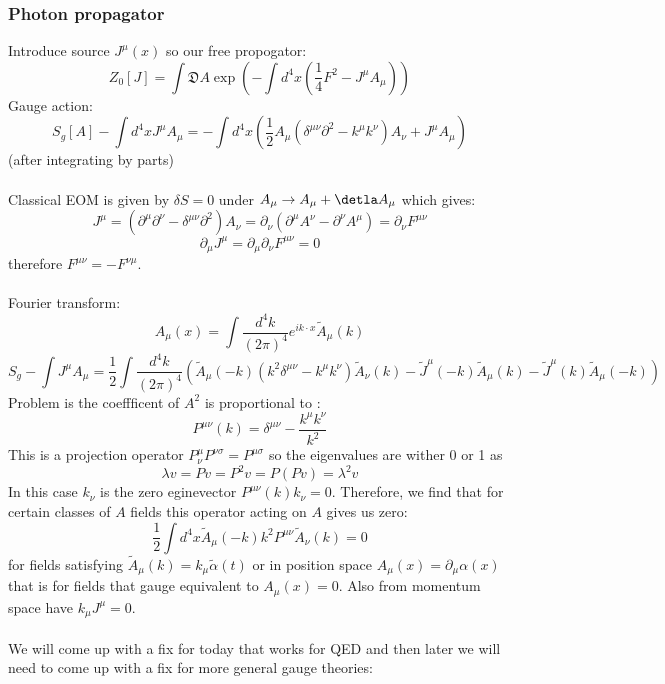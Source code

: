 \documentclass{article}
\begin{document}
      \subsubsection{Photon propagator}
      Introduce source $J^{\mu}(x)$ so our free propogator:
      $$
       Z_0[J] = \int \mathfrak{D} A \exp ( - \int d^4 x ( \frac{1}{4} F^2 - J^{\mu} A_{\mu}))
      $$
      Gauge action:
      $$
       S_g[A] - \int d^4 x J^{\mu} A_{\mu} = - \int d^4 x ( \frac{1}{2} A_{\mu} ( \delta^{\mu \nu} \partial^2 - k^{\mu} k^{\nu}) A_{\nu} + J^{\mu} A_{\mu})
      $$
      (after integrating by parts)\\\\
      Classical EOM is given by $\delta S = 0$ under $A_{\mu} \rightarrow A_{\mu} + \detla A_{\mu}$ which gives:
      $$
       J^{\mu} = ( \partial^{\mu} \partial^{\nu} - \delta^{\mu \nu} \partial^2) A_{\nu} = \partial_{\nu} ( \partial ^{\mu} A^{\nu} - \partial ^{\nu} A^{\mu}) = \partial_{\nu} F^{\mu \nu}
      $$
      $$
       \partial_{\mu} J^{\mu} = \partial_{\mu} \partial_{\nu} F^{\mu \nu} = 0
      $$
      therefore $F^{\mu \nu} = - F^{\nu \mu}$.\\\\
      Fourier transform:
      $$
      A_{\mu} (x) = \int \frac{d^4 k}{(2\pi)^4} e^{i k \cdot x} \tilde A_{\mu} ( k) 
      $$
      $$
      S_g - \int J^{\mu} A_{\mu} = \frac{1}{2} \int \frac{d^4 k}{(2\pi)^4} ( \tilde A_{\mu} (-k) ( k^2 \delta^{\mu \nu} - k^{\mu} k^{\nu} ) \tilde A_{\nu} (k) - \tilde J^{\mu} (-k) \tilde A_{\mu} (k) - \tilde J^{\mu} (k) \tilde A_{\mu}(-k))
      $$
      Problem is the coeffficent of $A^2$ is proportional to :
      $$
       P^{\mu \nu} (k) = \delta^{\mu \nu} - \frac{k^{\mu} k^{\nu}}{k^2}
      $$
      This is a projection operator $P^{\mu}_{\nu} P^{\nu \sigma} = P^{\mu \sigma}$ so the eigenvalues are wither 0 or 1 as 
      $$
       \lambda v = Pv = P^2 v = P(Pv) = \lambda^2 v
      $$
      In this case $k_{\nu}$ is the zero eginevector $P^{\mu \nu}(k) k_{\nu} = 0$. Therefore, we find that for certain classes of $A$ fields this operator acting on $A$ gives us zero:
      $$
      \frac{1}{2} \int d^4 x \tilde A_{\mu}(-k) k^2 P^{\mu \nu} \tilde A_{\nu} (k) = 0
      $$
      for fields satisfying $\tilde A_{\mu} (k) = k_{\mu} \tilde \alpha(t)$ or in position space $A_{\mu} (x) = \partial_{\mu} \alpha(x)$ that is for fields that gauge equivalent to $A_{\mu}(x) = 0$. Also from momentum space have $k_{\mu} J^{\mu} = 0$. \\\\
      We will come up with a fix for today that works for QED and then later we will need to come up with a fix for more general gauge theories:\\\\
\end{document}
